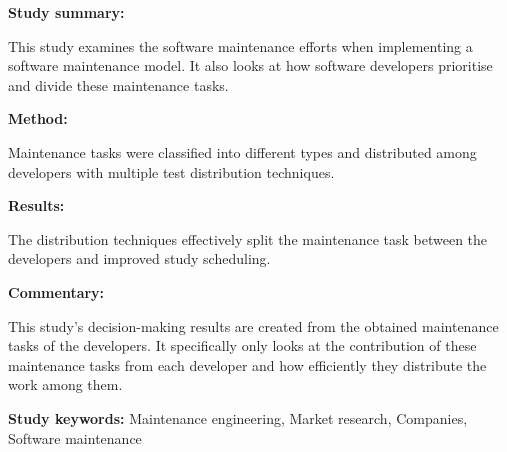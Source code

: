 \begin{tcolorbox}[colback=gray!5!white, colframe=pastelgreen!40!black, title=Trends in software maintenance tasks distribution among programmers: A study in a micro software company\cite{Stojanov2017}]
	\begin{minipage}[t]{0.25\textwidth}
		\textbf{Study summary:}
	\end{minipage}
	\hfill
	\begin{minipage}[t]{0.65\textwidth}
		This study examines the software maintenance efforts when implementing a software
		maintenance model. It also looks at how software developers prioritise and divide these
		maintenance tasks.
	\end{minipage}

	\vspace{0.75em} 

	\begin{minipage}[t]{0.25\textwidth}
		\textbf{Method:}
	\end{minipage}
	\hfill
	\begin{minipage}[t]{0.65\textwidth}
		Maintenance tasks were classified into different types and distributed among developers with multiple test distribution techniques.
	\end{minipage}

	\vspace{0.75em} 

	\begin{minipage}[t]{0.25\textwidth}
		\textbf{Results:}
	\end{minipage}
	\hfill
	\begin{minipage}[t]{0.65\textwidth}
		The distribution techniques effectively split the maintenance task between the developers and improved study scheduling.
	\end{minipage}

	\vspace{0.75em} 

	\begin{minipage}[t]{0.25\textwidth}
		\textbf{Commentary:}
	\end{minipage}
	\hfill
	\begin{minipage}[t]{0.65\textwidth}
		This study's decision-making results are created from the obtained maintenance tasks of the
		developers. It specifically only looks at the contribution of these maintenance tasks from
		each developer and how efficiently they distribute the work among them.
	\end{minipage}
	\tcblower
	\textbf{Study keywords:} Maintenance engineering, Market research, Companies, Software
	maintenance
\end{tcolorbox}

